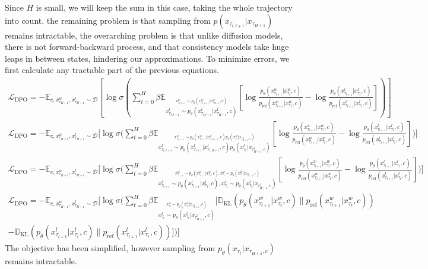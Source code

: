 \documentclass[10pt]{article}
\begin{document}
Since $H$ is small, we will keep the sum in this case, taking the whole trajectory into count. the remaining problem is that sampling from $p(x_{\tau_{t,t+1}}|x_{\tau_{H+1}})$ remains intractable, the overarching problem is that unlike diffusion models, there is not forward-backward process, and that consistency models take huge leaps in between states, hindering our approximations.
To minimize errors, we first calculate any tractable part of the previous equations.
	{
		\footnotesize
		\begin{gather}
			\mathcal{L}_\text{DPO}=-\mathbb{E}_{c,x_{\tau_{H+1}}^w,x_{\tau_{H+1}}^l\sim\mathcal{D}}\left[\log\sigma\left(\sum_{t=0}^H\beta\mathbb{E}_{
					\stackrel{{x_{\tau_{t,t+1}}^w\sim p_\theta(x_{\tau_{t,t+1}}^w|x_{\tau_{H+1}}^w,c)}}{x_{\tau_{t,t+1}}^l\sim p_\theta(x_{\tau_{t,t+1}}^l|x_{\tau_{H+1}}^l,c)}}\left[\log\frac{p_\theta(x_{\tau_{t+1}}^w|x_{\tau_t}^w,c)}{p_\text{ref}(x_{\tau_{t+1}}^w|x_{\tau_t}^w,c)}-\log\frac{p_\theta(x_{\tau_{t+1}}^l|x_{\tau_t}^l,c)}{p_\text{ref}(x_{\tau_{t+1}}^l|x_{\tau_t}^l,c)}\right]\right)\right]\\
			\mathcal{L}_\text{DPO}=-\mathbb{E}_{c,x_{\tau_{H+1}}^w,x_{\tau_{H+1}}^l\sim\mathcal{D}}\Bigg[\log\sigma\Bigg(\sum_{t=0}^H\beta\mathbb{E}_{
					\stackrel{{x_{\tau_{t,t+1}}^w\sim p_\theta(x_{\tau_{t+1}}^w|x_{\tau_{t,H+1}}^w,c)}p_\theta(x_{\tau_t}^w|x_{\tau_{H+1}^w,c})}{x_{\tau_{t,t+1}}^l\sim p_\theta(x_{\tau_{t+1}}^l|x_{\tau_{t,H+1}}^l,c)p_\theta(x_{\tau_t}^l|x_{\tau_{H+1}^l,c})}}
				\left[\log\frac{p_\theta(x_{\tau_{t+1}}^w|x_{\tau_t}^w,c)}{p_\text{ref}(x_{\tau_{t+1}}^w|x_{\tau_t}^w,c)}-\log\frac{p_\theta(x_{\tau_{t+1}}^l|x_{\tau_t}^l,c)}{p_\text{ref}(x_{\tau_{t+1}}^l|x_{\tau_t}^l,c)}\right]\Bigg)\Bigg]\\
			\mathcal{L}_\text{DPO}=-\mathbb{E}_{c,x_{\tau_{H+1}}^w,x_{\tau_{H+1}}^l\sim\mathcal{D}}\Bigg[\log\sigma\Bigg(\sum_{t=0}^H\beta\mathbb{E}_{
					\stackrel{{x_{\tau_{t+1}}^w\sim p_\theta(x_{\tau_{t+1}}^w|x_{\tau_{t}}^w,c)}, x_{\tau_t}^w\sim p_\theta(x_{\tau_t}^w|x_{\tau_{H+1}^w,c})}{x_{\tau_{t+1}}^l\sim p_\theta(x_{\tau_{t+1}}^l|x_{\tau_t}^l,c), x_{\tau_t}^l\sim p_\theta(x_{\tau_t}^l|x_{\tau_{H+1}^l,c})}}
				\left[\log\frac{p_\theta(x_{\tau_{t+1}}^w|x_{\tau_t}^w,c)}{p_\text{ref}(x_{\tau_{t+1}}^w|x_{\tau_t}^w,c)}-\log\frac{p_\theta(x_{\tau_{t+1}}^l|x_{\tau_t}^l,c)}{p_\text{ref}(x_{\tau_{t+1}}^l|x_{\tau_t}^l,c)}\right]\Bigg)\Bigg]
		\end{gather}
		\begin{multline}\label{eqn:ldpo_before_est}
			\mathcal{L}_\text{DPO}=-\mathbb{E}_{c,x_{\tau_{H+1}}^w,x_{\tau_{H+1}}^l\sim\mathcal{D}}\Bigg[\log\sigma\Bigg(\sum_{t=0}^H\beta\mathbb{E}_{
					\stackrel{x_{\tau_t}^w\sim p_\theta(x_{\tau_t}^w|x_{\tau_{H+1}^w},c)}{x_{\tau_t}^l\sim p_\theta(x_{\tau_t}^l|x_{\tau_{H+1}^l},c)}}
				\Bigg[\mathbb{D}_\text{KL}(p_\theta(x_{\tau_{t+1}}^w|x_{\tau_t}^w,c)\|p_\text{ref}(x_{\tau_{t+1}}^w|x_{\tau_t}^w,c)) \\
					-\mathbb{D}_\text{KL}(p_\theta(x_{\tau_{t+1}}^l|x_{\tau_t}^l,c)\|p_\text{ref}(x_{\tau_{t+1}}^l|x_{\tau_t}^l,c))\Bigg]\Bigg)\Bigg]
		\end{multline}
	}
The objective has been simplified, however sampling from $p_\theta(x_{\tau_t}|x_{\tau_{H+1},c})$ remains intractable.\clearpage
\end{document}
